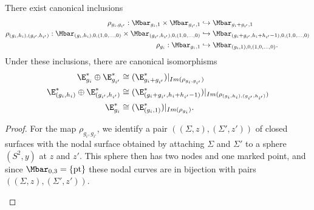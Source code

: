 \begin{lemma} \label{collisionModuli}
There exist canonical inclusions
\begin{align*}
\rho_{g_i,g_{i'}}:\Mbar_{g_i,1} \times \Mbar_{g_{i'},1} & \hookrightarrow \Mbar_{g_i+g_{i'},1}
\\
\rho_{(g_i,h_i),(g_{i'},h_{i'})}:\Mbar_{(g_i,h_i),0,(1,0,\ldots,0)} \times \Mbar_{(g_{i'},h_{i'}),0,(1,0,\ldots,0)} & \hookrightarrow \Mbar_{(g_i+g_{i'},h_i+h_{i'}-1),0,(1,0,\ldots,0)}
\\
\rho_{g_i}:\Mbar_{g_i,1} & \hookrightarrow \Mbar_{(g_{i},1),0,(1,0,\ldots,0)}.
\end{align*}
Under these inclusions, there are canonical isomorphisms
\begin{align*}
\E_{g_i}^* \oplus \E_{g_{i'}}^* & \cong (\E_{g_i+g_{i'}}^*)|_{Im(\rho_{g_i,g_{i'}})}
\\
\E_{(g_i,h_i)}^* \oplus \E_{(g_{i'},h_{i'})}^* & \cong (\E_{(g_i+g_{i'},h_i+h_{i'}-1)}^*)|_{Im(\rho_{(g_i,h_i),(g_{i'},h_{i'})})}
\\
\E_{g_i}^* & \cong (\E_{(g_{i},1)}^*)|_{Im(\rho_{g_i})}.
\end{align*}
\begin{proof}
For the map $\rho_{g_i,g_{i'}}$, we identify a pair $((\Sigma,z),(\Sigma',z'))$ of closed surfaces with the nodal surface obtained by attaching $\Sigma$ and $\Sigma'$ to a sphere $(S^2,y)$ at $z$ and $z'$. This sphere then has two nodes and one marked point, and since $\Mbar_{0,3}=\{\text{pt}\}$ these nodal curves are in bijection with pairs $((\Sigma,z),(\Sigma',z'))$.
\begin{figure}[ht]
\centering
{}
\end{figure}
\end{proof}
\end{lemma}
